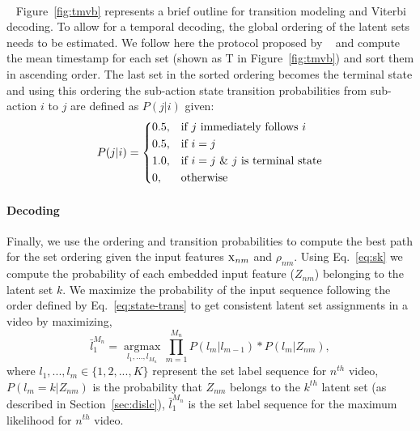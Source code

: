 \documentclass[final]{cvpr}
\begin{document}

\\
~\label{sec:tmvb}
\noindent Figure~\ref{fig:tmvb} represents a brief outline for transition modeling and Viterbi decoding. To allow for a temporal decoding, the global ordering of the latent sets needs to be estimated. We follow here the protocol proposed by ~\cite{kukleva2019unsupervised} and compute the mean timestamp for each set (shown as T in Figure~\ref{fig:tmvb}) and sort them in ascending order. 
The last set in the sorted ordering becomes the terminal state and using this ordering the sub-action state transition probabilities  from sub-action $i$ to $j$ are defined as $P(j|i)$ given:
\vspace{-0.3cm}
\begin{equation}
\label{eq:state-trans}
    P(j|i) = 
    \begin{dcases}
         0.5,& \text{if  $j$ immediately follows $i$ }\\
         0.5, & \text{if $i = j$} \\
         1.0, & \text{if $i = j$ \& $j$ is terminal state} \\
         0, & \text{otherwise}
    \end{dcases}
\end{equation}
\paragraph{Decoding}
\par Finally, we use the ordering and transition probabilities to compute the best path for the set ordering given the input features $\textsc{x}_{nm}$ and $\rho_{nm}$. 
Using Eq.~\ref{eq:sk} we compute the probability of each embedded input feature ($Z_{nm}$) belonging to the latent set $k$. 
We maximize the probability of the input sequence following the order defined by Eq.~\ref{eq:state-trans} to get consistent latent set assignments in a video by maximizing,
\vspace{-0.3cm}
\begin{equation}
    \label{eq:dec}
    \bar{l}_{1}^{M_{n}} = {\operatorname*{argmax}_{l_{1},...,l_{M_{n}}}}{\displaystyle \prod_{m=1}^{M_{n}} P(l_{m}|l_{m-1}) * P( l_{m} | Z_{nm})}, 
\end{equation}
\noindent where $l_{1}, ..., l_{m} \in \{1,2,...,K\}$ represent the set label sequence for $n^{th}$ video, $P( l_{m} = k | Z_{nm})$ is the probability that $Z_{nm}$ belongs to the $k^{th}$ latent set (as described in Section~\ref{sec:dislc}), $\bar{l}_{1}^{M_{n}}$ is the set label sequence for the maximum likelihood for $n^{th}$ video.
\end{document}
